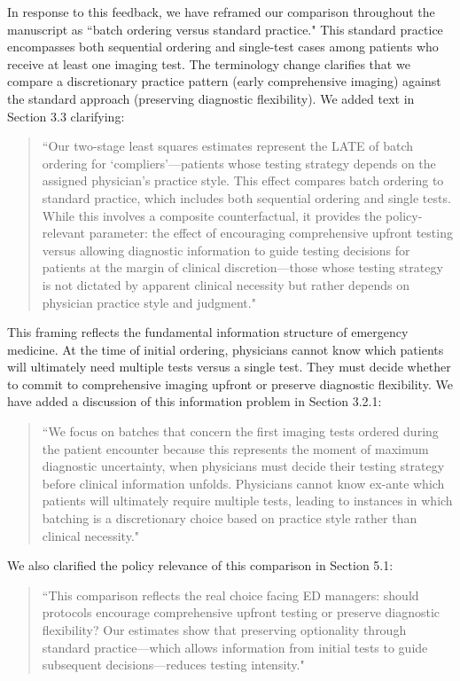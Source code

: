 \documentclass[11pt]{article}
\newcommand{\1}{\hbox{\rm 1\kern-.35em 1}}
\begin{document}
{In response to this feedback, we have reframed our comparison throughout the manuscript as ``batch ordering versus standard practice." This standard practice encompasses both sequential ordering and single-test cases among patients who receive at least one imaging test. The terminology change clarifies that we compare a discretionary practice pattern (early comprehensive imaging) against the standard approach (preserving diagnostic flexibility). We added text in Section 3.3 clarifying:

\begin{quote}
``Our two-stage least squares estimates represent the LATE of batch ordering for `compliers'---patients whose testing strategy depends on the assigned physician's practice style. This effect compares batch ordering to standard practice, which includes both sequential ordering and single tests. While this involves a composite counterfactual, it provides the policy-relevant parameter: the effect of encouraging comprehensive upfront testing versus allowing diagnostic information to guide testing decisions for patients at the margin of clinical discretion—those whose testing strategy is not dictated by apparent clinical necessity but rather depends on physician practice style and judgment."
\end{quote}

This framing reflects the fundamental information structure of emergency medicine. At the time of initial ordering, physicians cannot know which patients will ultimately need multiple tests versus a single test. They must decide whether to commit to comprehensive imaging upfront or preserve diagnostic flexibility. We have added a discussion of this information problem in Section 3.2.1:

\begin{quote}
``We focus on batches that concern the first imaging tests ordered during the patient encounter because this represents the moment of maximum diagnostic uncertainty, when physicians must decide their testing strategy before clinical information unfolds. Physicians cannot know ex-ante which patients will ultimately require multiple tests, leading to instances in which batching is a discretionary choice based on practice style rather than clinical necessity."
\end{quote}

We also clarified the policy relevance of this comparison in Section 5.1:

\begin{quote}
``This comparison reflects the real choice facing ED managers: should protocols encourage comprehensive upfront testing or preserve diagnostic flexibility? Our estimates show that preserving optionality through standard practice---which allows information from initial tests to guide subsequent decisions---reduces testing intensity."
\end{quote}

}
\end{document}
